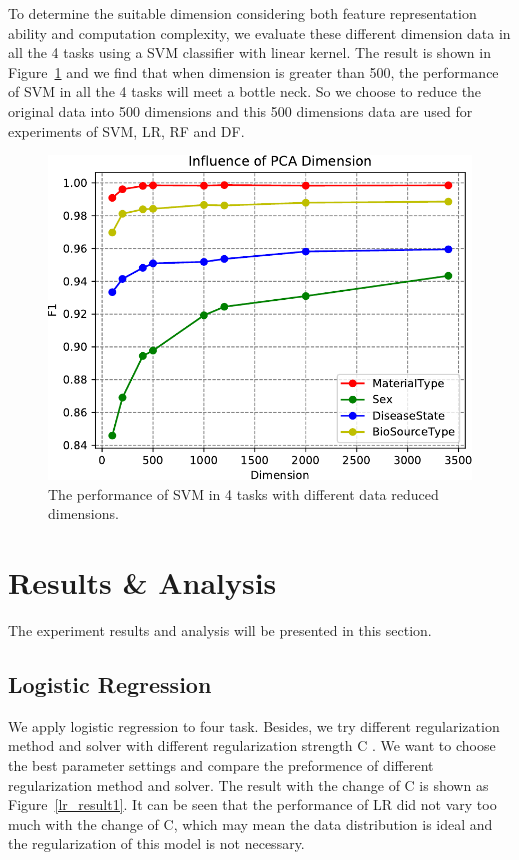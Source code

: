 \documentclass[sigconf]{acmart}
\begin{document}
	To determine the suitable dimension considering both feature representation ability and computation complexity, we evaluate these different dimension data in all the 4 tasks using a SVM classifier with linear kernel. The result is shown in Figure~\ref{fig:PCA_Dimension} and we find that when dimension is greater than 500, the performance of SVM in all the 4 tasks will meet a bottle neck. So we choose to reduce the original data into 500 dimensions and this 500 dimensions data are used for experiments of SVM, LR, RF and DF.
	
\begin{figure}[h]
\centering
\includegraphics[width=0.8\linewidth]{../figs/PCA_Dimension}
\caption{The performance of SVM in 4 tasks with different data reduced dimensions.}
\label{fig:PCA_Dimension}
\end{figure}
	
\section{Results \& Analysis}
The experiment results and analysis will be presented in this section.


\subsection{Logistic Regression} 
We apply logistic regression to four task. Besides, we try different regularization method and solver  with different regularization strength C . We want to choose the best parameter settings and compare the preformence of different regularization method and solver. The result with the change of C is shown as Figure~\ref{lr_result1}. It can be seen that the performance of LR did not vary too much with the change of C, which may mean the data distribution is ideal and the  regularization of this model is not necessary.
\end{document}
